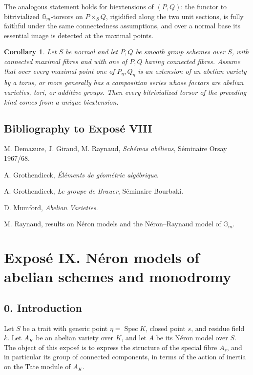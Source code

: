 \documentclass[11pt]{article}
\theoremstyle{plain}
\newtheorem{corollary}[theorem]{Corollary}
\theoremstyle{definition}
\theoremstyle{remark}
\DeclareMathOperator{\Spec}{Spec}
\newcommand{\Gm}{\mathbb G_m}
\begin{document}
The analogous statement holds for biextensions of \((P,Q)\): the functor to
bitrivialized \(\Gm\)-torsors on \(P\times_S Q\), rigidified along the two unit
sections, is fully faithful under the same connectedness assumptions, and over a
normal base its essential image is detected at the maximal points.

\begin{corollary}
Let \(S\) be normal and let \(P,Q\) be smooth group schemes over \(S\), with
connected maximal fibres and with one of \(P,Q\) having connected fibres. Assume
that over every maximal point one of \(P_\eta,Q_\eta\) is an extension of an
abelian variety by a torus, or more generally has a composition series whose
factors are abelian varieties, tori, or additive groups. Then every bitrivialized
torsor of the preceding kind comes from a unique biextension.
\end{corollary}

\subsection*{Bibliography to Exposé VIII}

\begin{enumerate}[label={[\arabic*]}]
\item M. Demazure, J. Giraud, M. Raynaud, \emph{Schémas abéliens}, Séminaire
Orsay 1967/68.
\item A. Grothendieck, \emph{Éléments de géométrie algébrique}.
\item A. Grothendieck, \emph{Le groupe de Brauer}, Séminaire Bourbaki.
\item D. Mumford, \emph{Abelian Varieties}.
\item M. Raynaud, results on Néron models and the Néron--Raynaud model of
\(\Gm\).
\end{enumerate}

\clearpage
\section*{Exposé IX. Néron models of abelian schemes and monodromy}

\subsection*{0. Introduction}

Let \(S\) be a trait with generic point \(\eta=\Spec K\), closed point \(s\),
and residue field \(k\). Let \(A_K\) be an abelian variety over \(K\), and let
\(A\) be its Néron model over \(S\). The object of this exposé is to express the
structure of the special fibre \(A_s\), and in particular its group of connected
components, in terms of the action of inertia on the Tate module of \(A_K\).
\end{document}
